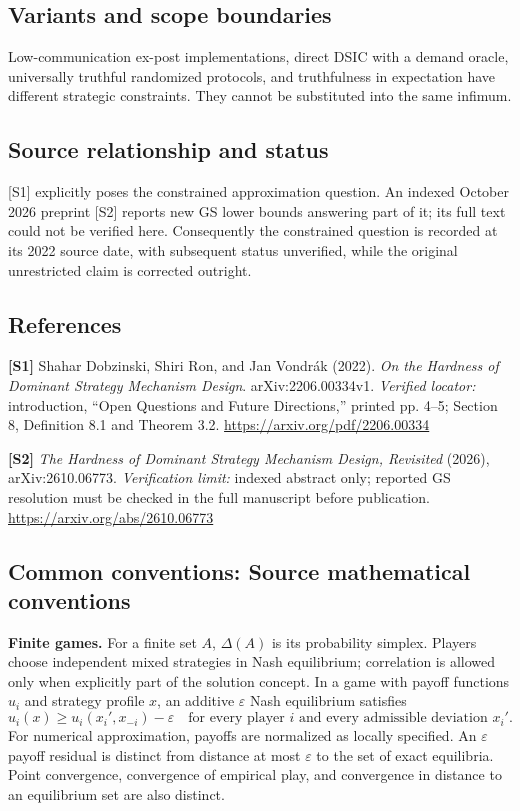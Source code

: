 \documentclass[11pt,a4paper]{article}
\begin{document}
\subsection*{Variants and scope boundaries}
Low-communication ex-post implementations, direct DSIC with a demand oracle, universally truthful randomized protocols, and truthfulness in expectation have different strategic constraints. They cannot be substituted into the same infimum.
\subsection*{Source relationship and status}
[S1] explicitly poses the constrained approximation question. An indexed October 2026 preprint [S2] reports new GS lower bounds answering part of it; its full text could not be verified here. Consequently the constrained question is recorded at its 2022 source date, with subsequent status unverified, while the original unrestricted claim is corrected outright.
\subsection*{References}
\begingroup\footnotesize\raggedright
\textbf{[S1]} Shahar Dobzinski, Shiri Ron, and Jan Vondr\'ak (2022). \emph{On the Hardness of Dominant Strategy Mechanism Design}. arXiv:2206.00334v1. \textit{Verified locator:} introduction, ``Open Questions and Future Directions,'' printed pp. 4--5; Section 8, Definition 8.1 and Theorem 3.2. \url{https://arxiv.org/pdf/2206.00334}
\par\textbf{[S2]} \emph{The Hardness of Dominant Strategy Mechanism Design, Revisited} (2026), arXiv:2610.06773. \textit{Verification limit:} indexed abstract only; reported GS resolution must be checked in the full manuscript before publication. \url{https://arxiv.org/abs/2610.06773}
\par\endgroup

\subsection*{Common conventions: Source mathematical conventions}

\textbf{Finite games.} For a finite set $A$, $\Delta(A)$ is its probability
simplex. Players choose independent mixed strategies in Nash equilibrium;
correlation is allowed only when explicitly part of the solution concept.
In a game with payoff functions $u_i$ and strategy profile $x$, an additive
$\varepsilon$ Nash equilibrium satisfies
\[
 u_i(x)\geq u_i(x_i',x_{-i})-\varepsilon
 \quad\text{for every player $i$ and every admissible deviation $x_i'$}.
\]
For numerical approximation, payoffs are normalized as locally specified.
An $\varepsilon$ payoff residual is distinct from distance at most
$\varepsilon$ to the set of exact equilibria. Point convergence, convergence
of empirical play, and convergence in distance to an equilibrium set are
also distinct.
\end{document}
